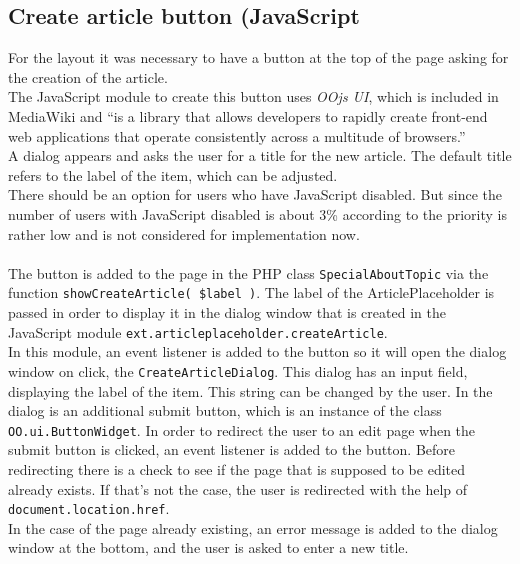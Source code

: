 \subsection{Create article button (JavaScript}
		
For the layout it was necessary to have a button at the top of the page asking for the creation of the article. \\
The JavaScript module to create this button uses \textit{OOjs UI}, which is included in MediaWiki and ``is a library that allows developers to rapidly create front-end web applications that operate consistently across a multitude of browsers.'' \citep{wiki:27} \\
A dialog appears and asks the user for a title for the new article. The default title refers to the label of the item, which can be adjusted. \\
There should be an option for users who have JavaScript disabled. But since the number of users with JavaScript disabled is about 3\% according to \citet{wiki:02}  the priority is rather low and is not considered for implementation now. \\
\\
The button is added to the page in the PHP class \texttt{\justify SpecialAboutTopic} via the function \texttt{\justify showCreateArticle( \$label )}. The label of the ArticlePlaceholder is passed in order to display it in the dialog window that is created in the JavaScript module \texttt{\justify ext.articleplaceholder.createArticle}. \\
In this module, an event listener is added to the button so it will open the dialog window on click, the \texttt{CreateArticleDialog}. This dialog has an input field, displaying the label of the item. This string can be changed by the user. In the dialog is an additional submit button, which is an instance of the class \texttt{OO.ui.ButtonWidget}. In order to redirect the user to an edit page when the submit button is clicked, an event listener is added to the button. Before redirecting there is a check to see if the page that is supposed to be edited already exists. If that's not the case, the user is redirected with the help of \texttt{\justify document.location.href}. \\
In the case of the page already existing, an error message is added to the dialog window at the bottom, and the user is asked to enter a new title.